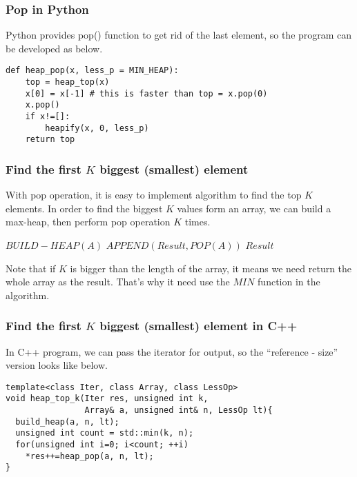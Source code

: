 \documentclass{article}
\begin{document}
\subsubsection*{Pop in Python}

Python provides pop() function to get rid of the last element,
so the program can be developed as below.

\begin{lstlisting}
def heap_pop(x, less_p = MIN_HEAP):
    top = heap_top(x)
    x[0] = x[-1] # this is faster than top = x.pop(0)
    x.pop()
    if x!=[]:
        heapify(x, 0, less_p)
    return top
\end{lstlisting}

\subsubsection{Find the first $K$ biggest (smallest) element}

With pop operation, it is easy to implement algorithm to
find the top $K$ elements. In order to find the biggest $K$
values form an array, we can build a max-heap, then perform
pop operation $K$ times.

\begin{algorithmic}[1]
  \State $BUILD-HEAP(A)$
    \State $APPEND(Result, POP(A))$
  \EndFor
  \State \Return $Result$
\EndFunction
\end{algorithmic}

Note that if $K$ is bigger than the length of the array, it means
we need return the whole array as the result. That's why it need
use the $MIN$ function in the algorithm.

\subsubsection*{Find the first $K$ biggest (smallest) element in C++}

In C++ program, we can pass the iterator for output, so the
``reference - size'' version looks like below.

\lstset{language=C++}
\begin{lstlisting}
template<class Iter, class Array, class LessOp>
void heap_top_k(Iter res, unsigned int k,
                Array& a, unsigned int& n, LessOp lt){
  build_heap(a, n, lt);
  unsigned int count = std::min(k, n);
  for(unsigned int i=0; i<count; ++i)
    *res++=heap_pop(a, n, lt);
}
\end{lstlisting}
\end{document}

